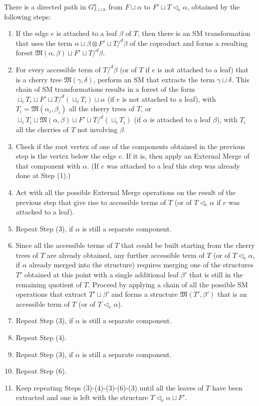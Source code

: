 \documentclass[12pt]{amsart}
\numberwithin{equation}{section}
\def\fM{{\mathfrak M}}
\begin{document}
There is a directed path in $G^a_{L \sqcup \alpha}$ from $F \sqcup \alpha$ to 
$F'\sqcup T \lhd_e \alpha$, obtained by the following steps:
\begin{enumerate}
\item  If the edge $e$ is attached to a leaf $\beta$ of $T$, then there is
an SM transformation that uses the term $\alpha \sqcup \beta \otimes F'\sqcup T/^d \beta$ of the coproduct 
and forms a resulting forest $\fM(\alpha,\beta)\sqcup F'\sqcup T/^d \beta $. 
\item For every accessible term of $T/^d \beta$ (or of $T$ if $e$ is not attached to a leaf) 
that is a cherry tree $\fM(\gamma,\delta)$, perform an SM that extracts the term
$\gamma \sqcup \delta$. This chain of SM transformations results in 
a forest of the form $\sqcup_i T_i \sqcup F' \sqcup T/^d(\sqcup_i T_i)\sqcup \alpha$ (if $e$ is not
attached to a leaf), with $T_i=\fM(\alpha_i,\beta_i)$ all the cherry trees of $T$, or
$\sqcup_i T_i \sqcup \fM(\alpha,\beta)\sqcup F' \sqcup T/^d(\sqcup_i T_i)$ (if $\alpha$ is attached
to a leaf $\beta$), with $T_i$ all the cherries of $T$ not involving $\beta$. 
\item Check if the root vertex of one of the components obtained in the previous step is the vertex below
the edge $e$. If it is, then apply an External Merge of that component with $\alpha$. (If $e$ was attached to a leaf
this step was already done at Step (1).)
\item Act with all the possible External Merge operations on the result of the previous step that
give rise to accessible terms of $T$ (or of $T \lhd_e \alpha$ if $e$ was attached to a leaf). 
\item Repeat Step (3), if $\alpha$ is still a separate component. 
\item Since all the accessible terms of $T$ that could be built starting from the cherry trees of $T$
are already obtained, any further accessible term of $T$ (or of $T \lhd_e \alpha$, if $\alpha$ already merged into the
structure) requires merging one of the structures $T'$ obtained at this point with a single additional leaf $\beta'$ that is still
in the remaining quotient of $T$. Proceed by applying a chain of all the possible SM operations that extract $T' \sqcup \beta'$ 
and forms a structure $\fM(T',\beta')$ that is an accessible term of $T$ (or of $T \lhd_e \alpha$).
\item Repeat Step (3), if $\alpha$ is still a separate component. 
\item Repeat Step (4).
\item Repeat Step (3), if $\alpha$ is still a separate component. 
\item Repeat Step (6).
\item Keep repeating Steps (3)-(4)-(3)-(6)-(3) until all the leaves of $T$ have been extracted and
one is left with the structure $T \lhd_e \alpha \sqcup F'$.
\end{enumerate}
\end{document}
